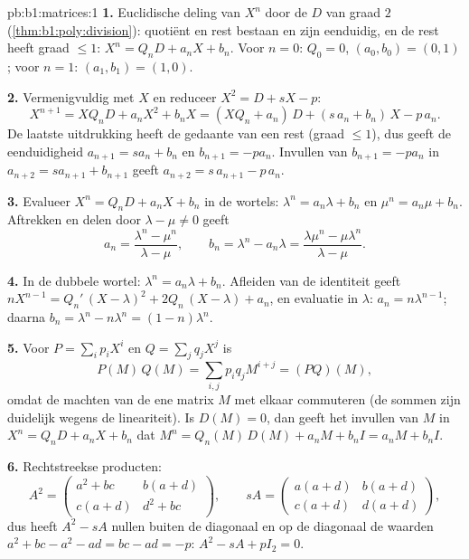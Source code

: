 \begin{solution}{pb:b1:matrices:1}
\textbf{1.} Euclidische deling van $X^n$ door de  $D$ van
graad $2$ (\cref{thm:b1:poly:division}): quotiënt en rest bestaan
en zijn eenduidig, en de rest heeft graad $\leq 1$: $X^n = Q_n D +
a_n X + b_n$. Voor $n = 0$: $Q_0 = 0$, $(a_0, b_0) = (0, 1)$; voor
$n = 1$: $(a_1, b_1) = (1, 0)$.

\textbf{2.} Vermenigvuldig met $X$ en reduceer $X^2 = D + sX - p$:
\[
X^{n+1} = X Q_n D + a_n X^2 + b_n X
= (X Q_n + a_n)\,D + (s\,a_n + b_n)\,X - p\,a_n .
\]
De laatste uitdrukking heeft de gedaante van een rest (graad $\leq
1$), dus geeft de eenduidigheid $a_{n+1} = s a_n + b_n$ en $b_{n+1}
= -p a_n$. Invullen van $b_{n+1} = -pa_n$ in $a_{n+2} = s a_{n+1} +
b_{n+1}$ geeft $a_{n+2} = s\,a_{n+1} - p\,a_n$.

\textbf{3.} Evalueer $X^n = Q_n D + a_n X + b_n$ in de wortels:
$\lambda^n = a_n\lambda + b_n$ en $\mu^n = a_n\mu + b_n$. Aftrekken
en delen door $\lambda - \mu \neq 0$ geeft
\[
a_n = \frac{\lambda^n - \mu^n}{\lambda - \mu},
\qquad
b_n = \lambda^n - a_n\lambda
= \frac{\lambda\mu^n - \mu\lambda^n}{\lambda - \mu} .
\]

\textbf{4.} In de dubbele wortel: $\lambda^n = a_n\lambda + b_n$.
Afleiden van de identiteit geeft $nX^{n-1} = Q_n'\,(X - \lambda)^2
+ 2Q_n\,(X - \lambda) + a_n$, en evaluatie in $\lambda$: $a_n =
n\lambda^{n-1}$; daarna $b_n = \lambda^n - n\lambda^{n} = (1 -
n)\lambda^{n}$.

\textbf{5.} Voor $P = \sum_i p_i X^i$ en $Q = \sum_j q_j X^j$ is
\[
P(M)\,Q(M) = \sum_{i,j} p_i q_j M^{i+j} = (PQ)(M),
\]
omdat de machten van de ene matrix $M$ met elkaar commuteren (de
sommen zijn duidelijk wegens de lineariteit). Is $D(M) = 0$, dan
geeft het invullen van $M$ in $X^n = Q_n D + a_n X + b_n$ dat $M^n
= Q_n(M)\,D(M) + a_n M + b_n I = a_n M + b_n I$.

\textbf{6.} Rechtstreekse producten:
\[
A^2 = \begin{pmatrix}
a^2 + bc & b(a + d)\\
c(a + d) & d^2 + bc
\end{pmatrix},
\qquad
s A = \begin{pmatrix}
a(a+d) & b(a+d)\\
c(a+d) & d(a+d)
\end{pmatrix},
\]
dus heeft $A^2 - sA$ nullen buiten de diagonaal en op de diagonaal
de waarden $a^2 + bc - a^2 - ad = bc - ad = -p$: $A^2 - sA + pI_2 =
0$.


\end{solution}
